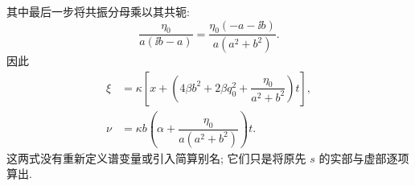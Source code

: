 其中最后一步将共振分母乘以其共轭:
\begin{equation*}
\dfrac{\eta_0}{a(\ii b-a)}
=\dfrac{\eta_0(-a-\ii b)}{a(a^2+b^2)}.
\end{equation*}
因此
\begin{equation*}
\begin{aligned}
\xi
&=\kappa\left[
x+\left(4\beta b^2+2\beta q_0^2
+\dfrac{\eta_0}{a^2+b^2}\right)t
\right],\\
\nu
&=\kappa b\left(\alpha+\dfrac{\eta_0}{a(a^2+b^2)}\right)t.
\end{aligned}
\end{equation*}
这两式没有重新定义谱变量或引入简算别名;
它们只是将原先 $s$ 的实部与虚部逐项算出.
